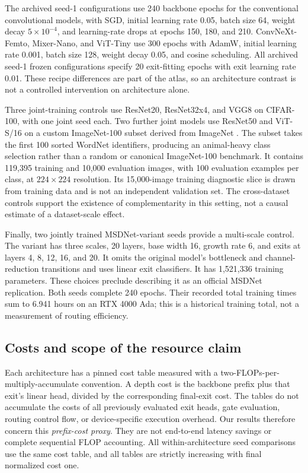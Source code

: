 \documentclass[11pt,a4paper]{article}
\begin{document}
The archived seed-1 configurations use 240 backbone epochs for the conventional convolutional models, with SGD, initial learning rate 0.05, batch size 64, weight decay $5\times10^{-4}$, and learning-rate drops at epochs 150, 180, and 210. ConvNeXt-Femto, Mixer-Nano, and ViT-Tiny use 300 epochs with AdamW, initial learning rate 0.001, batch size 128, weight decay 0.05, and cosine scheduling. All archived seed-1 frozen configurations specify 20 exit-fitting epochs with exit learning rate 0.01. These recipe differences are part of the atlas, so an architecture contrast is not a controlled intervention on architecture alone.

Three joint-training controls use ResNet20, ResNet32x4, and VGG8 on CIFAR-100, with one joint seed each. Two further joint models use ResNet50 and ViT-S/16 on a custom ImageNet-100 subset derived from ImageNet \citep{imagenet}. The subset takes the first 100 sorted WordNet identifiers, producing an animal-heavy class selection rather than a random or canonical ImageNet-100 benchmark. It contains 119,395 training and 10,000 evaluation images, with 100 evaluation examples per class, at $224\times224$ resolution. Its 15,000-image training diagnostic slice is drawn from training data and is not an independent validation set. The cross-dataset controls support the existence of complementarity in this setting, not a causal estimate of a dataset-scale effect.

Finally, two jointly trained MSDNet-variant seeds provide a multi-scale control. The variant has three scales, 20 layers, base width 16, growth rate 6, and exits at layers 4, 8, 12, 16, and 20. It omits the original model's bottleneck and channel-reduction transitions and uses linear exit classifiers. It has 1,521,336 training parameters. These choices preclude describing it as an official MSDNet replication. Both seeds complete 240 epochs. Their recorded total training times sum to 6.941 hours on an RTX 4000 Ada; this is a historical training total, not a measurement of routing efficiency.

\subsection{Costs and scope of the resource claim}
Each architecture has a pinned cost table measured with a two-FLOPs-per-multiply-accumulate convention. A depth cost is the backbone prefix plus that exit's linear head, divided by the corresponding final-exit cost. The tables do not accumulate the costs of all previously evaluated exit heads, gate evaluation, routing control flow, or device-specific execution overhead. Our results therefore concern this \emph{prefix-cost proxy}. They are not end-to-end latency savings or complete sequential FLOP accounting. All within-architecture seed comparisons use the same cost table, and all tables are strictly increasing with final normalized cost one.
\end{document}
